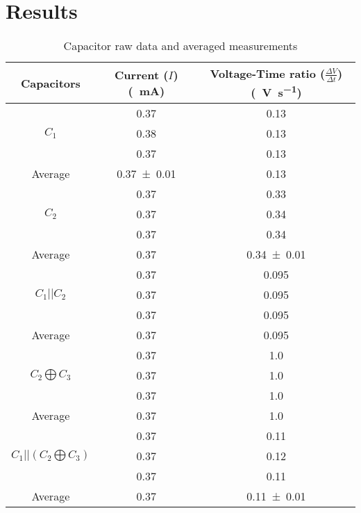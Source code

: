 \documentclass[a4paper]{scrartcl}
\begin{document}
\section{Results}
\begin{table}
    \centering
    \begin{tabular}{c | c | c}
        Capacitors & Current (\(I\)) (\SI{}{\milli\ampere}) & Voltage-Time ratio (\(\frac{\Delta V}{\Delta t}\)) (\SI{}{\volt\per\second}) \\
        \hline
        
        & \SI{0.37}{} & \SI{0.13}{} \\
        \(C_1\) & \SI{0.38}{} & \SI{0.13}{} \\
        & \SI{0.37}{} & \SI{0.13}{} \\
        \hdashline
        Average & \SI{0.37 \pm 0.01}{} & \SI{0.13}{} \\
        \hline
        
        & \SI{0.37}{} & \SI{0.33}{} \\
        \(C_2\) & \SI{0.37}{} & \SI{0.34}{} \\
        & \SI{0.37}{} & \SI{0.34}{} \\
        \hdashline
        Average & \SI{0.37}{} & \SI{0.34 \pm 0.01}{} \\
        \hline
        
        & \SI{0.37}{} & \SI{0.095}{} \\
        \(C_1 || C_2\) & \SI{0.37}{} & \SI{0.095}{} \\
        & \SI{0.37}{} & \SI{0.095}{} \\
        \hdashline
        Average & \SI{0.37}{} & \SI{0.095}{} \\
        \hline
        
        & \SI{0.37}{} & \SI{1.0}{} \\
        \(C_2 \bigoplus C_3\) & \SI{0.37}{} & \SI{1.0}{} \\
        & \SI{0.37}{} & \SI{1.0}{} \\
        \hdashline
        Average & \SI{0.37}{} & \SI{1.0}{} \\
        \hline
                
        & \SI{0.37}{} & \SI{0.11}{} \\
        \(C_1 || (C_2 \bigoplus C_3)\) & \SI{0.37}{} & \SI{0.12}{} \\
        & \SI{0.37}{} & \SI{0.11}{} \\
        \hdashline
        Average & \SI{0.37}{} & \SI{0.11 \pm 0.01}{} \\
        \hline
    \end{tabular}
    \caption{Capacitor raw data and averaged measurements}
    \label{tab:capacitor_data}
\end{table}
\end{document}
